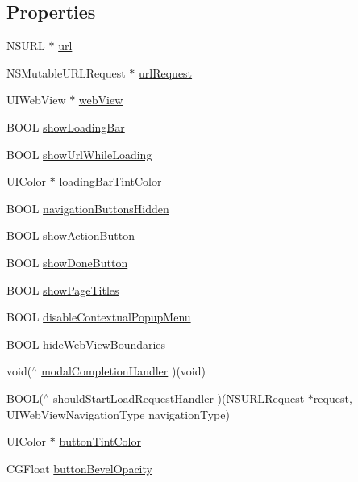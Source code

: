 \subsection*{Properties}
\begin{DoxyCompactItemize}
\item 
N\+S\+U\+R\+L $\ast$ \hyperlink{interface_t_o_web_view_controller_a32d5535e58748da901994b6c7bc12d53}{url}
\item 
N\+S\+Mutable\+U\+R\+L\+Request $\ast$ \hyperlink{interface_t_o_web_view_controller_a8b671f36f5e0ba80a1a5a449f3d82b80}{url\+Request}
\item 
U\+I\+Web\+View $\ast$ \hyperlink{interface_t_o_web_view_controller_acc4a012c799ce2ab0834426a68bba120}{web\+View}
\item 
B\+O\+O\+L \hyperlink{interface_t_o_web_view_controller_a444c7f665ca6923c4cf38b00e95b8061}{show\+Loading\+Bar}
\item 
B\+O\+O\+L \hyperlink{interface_t_o_web_view_controller_a3c6797f76219f17cbc29ee118c65e943}{show\+Url\+While\+Loading}
\item 
U\+I\+Color $\ast$ \hyperlink{interface_t_o_web_view_controller_ab791dcbf2db93c158264caa4ed4cdf53}{loading\+Bar\+Tint\+Color}
\item 
B\+O\+O\+L \hyperlink{interface_t_o_web_view_controller_af512e482ad9d8f9334413c7d80f06247}{navigation\+Buttons\+Hidden}
\item 
B\+O\+O\+L \hyperlink{interface_t_o_web_view_controller_a6a44854475f43f7e3e81a6805f5d67af}{show\+Action\+Button}
\item 
B\+O\+O\+L \hyperlink{interface_t_o_web_view_controller_a529bbbcc8ff2874152516dd6ab4e5db2}{show\+Done\+Button}
\item 
B\+O\+O\+L \hyperlink{interface_t_o_web_view_controller_a8456c37c8259cb9091ddeeaac3d29608}{show\+Page\+Titles}
\item 
B\+O\+O\+L \hyperlink{interface_t_o_web_view_controller_aeb510e037dde05a88ff6fb0175d26f3f}{disable\+Contextual\+Popup\+Menu}
\item 
B\+O\+O\+L \hyperlink{interface_t_o_web_view_controller_a11fadf270df4ff5b11664f051ed061eb}{hide\+Web\+View\+Boundaries}
\item 
void($^\wedge$ \hyperlink{interface_t_o_web_view_controller_a56610537e590382f92d90fd797239d0b}{modal\+Completion\+Handler} )(void)
\item 
B\+O\+O\+L($^\wedge$ \hyperlink{interface_t_o_web_view_controller_a030a5b87b4ba4fb31e7bdbe10656f62a}{should\+Start\+Load\+Request\+Handler} )(N\+S\+U\+R\+L\+Request $\ast$request, U\+I\+Web\+View\+Navigation\+Type navigation\+Type)
\item 
U\+I\+Color $\ast$ \hyperlink{interface_t_o_web_view_controller_a75c65039f6c1205a568206be6ea25558}{button\+Tint\+Color}
\item 
C\+G\+Float \hyperlink{interface_t_o_web_view_controller_a50f0e3cdfdbf352c7d9d46395190208a}{button\+Bevel\+Opacity}
\end{DoxyCompactItemize}


